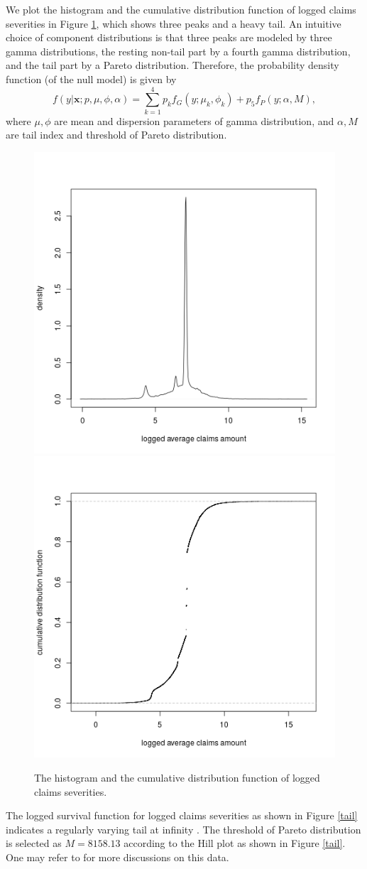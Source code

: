 \documentclass[11pt]{article}
\numberwithin{equation}{section}
\def\bx{\boldsymbol{x}}
\begin{document}
We plot the histogram and the cumulative distribution function of logged claims severities in Figure \ref{hist}, which shows three peaks and a heavy tail. 
An intuitive choice of component distributions is that 
three peaks are modeled by three gamma distributions, the resting non-tail part by a fourth gamma distribution, and the tail part by a Pareto distribution.
Therefore, the probability density function (of the null model) is given by
\begin{equation}\label{sev-0}
	f(y|\bx;p,\mu,\phi,\alpha)=\sum_{k=1}^4p_kf_{G}(y;\mu_k,\phi_k)+p_5f_{P}(y;\alpha,M),
\end{equation}
	where $\mu,\phi$ are mean and dispersion parameters of gamma distribution, and $\alpha, M$ are tail index and threshold of Pareto distribution. 
\begin{figure}[h!]
	\centering
	\includegraphics[width=0.4\linewidth]{../plots/sev/hist.png}
	\includegraphics[width=0.4\linewidth]{../plots/sev/cdf.png}
	\caption{The histogram and the cumulative distribution function of logged claims severities.}\label{hist}
\end{figure}

	The logged survival function for logged claims severities as shown in Figure \ref{tail} indicates a regularly varying  tail at infinity \citep{embrechts2013modeling}.
	The threshold of Pareto distribution is selected as $M=8158.13$ according to the Hill plot \citep{resnick1997heavy} as shown in Figure \ref{tail}. One may refer to \citet{wuthrich2022statistical} for more discussions on this data.
	
\end{document}
